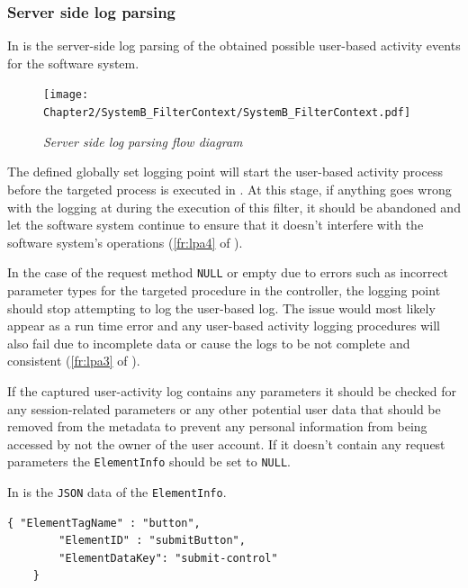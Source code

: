 \subsubsection{Server side log parsing}
In  is the server-side log parsing of the obtained possible user-based activity events for the software system.

\clearpage

\begin{figure}[!htb]
	\centering
	\texttt{[image: Chapter2/SystemB\_FilterContext/SystemB\_FilterContext.pdf]}
	\caption[Server side log parsing flow diagram]
	{\textit{Server side log parsing flow diagram}}\label{fig:ch2_loggingParse}
\end{figure}

\clearpage

The defined globally set logging point will start the user-based activity process before the targeted process is executed in . At this stage, if anything goes wrong with the logging at during the execution of this filter, it should be abandoned and let the software system continue to ensure that it doesn't interfere with the software system's operations (\ref{fr:lpa4} of ).\par In the case of the request method \texttt{NULL} or empty due to errors such as incorrect parameter types for the targeted procedure in the controller, the logging point should stop attempting to log the user-based log. The issue would most likely appear as a run time error and any user-based activity logging procedures will also fail due to incomplete data or cause the logs to be not complete and consistent (\ref{fr:lpa3} of ).\par If the captured user-activity log contains any parameters it should be checked for any session-related parameters or any other potential user data that should be removed from the metadata to prevent any personal information from being accessed by not the owner of the user account. If it doesn't contain any request parameters the \texttt{ElementInfo} should be set to \texttt{NULL}.\par In  is the \texttt{JSON} data of the \texttt{ElementInfo}. 

\begin{lstlisting}[style=json, caption={\textit{Element properties JSON}}, label={fig:Ch2_ElementInfo}] 
	{ "ElementTagName" : "button",
		"ElementID" : "submitButton",
		"ElementDataKey": "submit-control"		
	}
\end{lstlisting}


